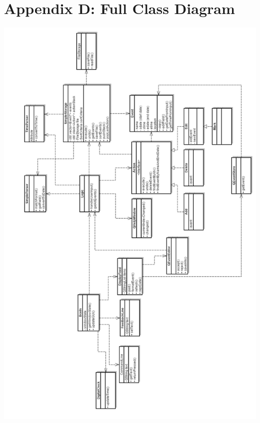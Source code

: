 \documentclass[12pt]{extarticle}
\begin{document}
\section{Appendix D: Full Class Diagram}
\includegraphics[width=\textwidth, height=\textheight - 2cm]{class_diagram}
\end{document}
